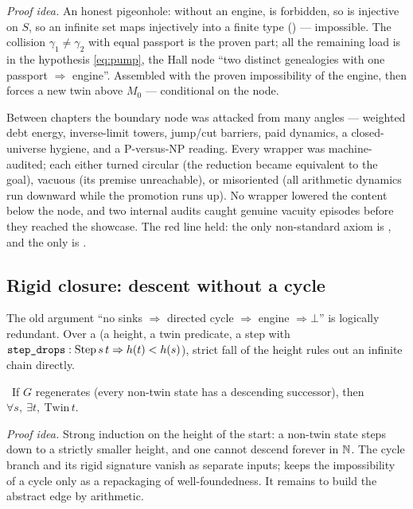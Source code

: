 \emph{Proof idea.} An honest pigeonhole: without an engine,  is forbidden, so  is
injective on $S$, so an infinite set maps injectively into a finite type
() --- impossible. The collision $\gamma_1\ne\gamma_2$ with equal
passport is the \green{} proven part; all the remaining load is in the \red{} hypothesis
\cref{eq:pump}, the Hall node ``two distinct genealogies with one passport $\Rightarrow$ engine''.
Assembled with the proven impossibility of the engine,  then
forces a new twin above $M_0$ --- conditional on the node.

\begin{remark}
Between chapters the boundary node was attacked from many angles --- weighted debt energy, inverse-limit
towers, jump/cut barriers, paid dynamics, a closed-universe hygiene, and a $\mathrm{P}$-versus-$\mathrm{NP}$
reading. Every wrapper was machine-audited; each either turned circular (the reduction became
equivalent to the goal), vacuous (its premise unreachable), or misoriented (all arithmetic dynamics run
downward while the promotion runs up). No wrapper lowered the content below the node, and two internal
audits caught genuine vacuity episodes before they reached the showcase. The red line held: the only
non-standard axiom is \axiom{}, and the only  is .
\end{remark}

\subsection{Rigid closure: descent without a cycle}

The old argument ``no sinks $\Rightarrow$ directed cycle $\Rightarrow$ engine $\Rightarrow\bot$'' is
logically redundant. Over a  (a height, a twin predicate, a step with
$\texttt{step\_drops}:\mathrm{Step}\,s\,t\Rightarrow h(t)<h(s)$), strict fall of the height rules out an
infinite chain directly.

\begin{theorem}\label{thm:reaches_twin}
\green{}\ If $G$ regenerates (every non-twin state has a descending successor), then
$\forall s,\ \exists t,\ \mathrm{Twin}\,t$. 
\end{theorem}

\emph{Proof idea.} Strong induction on the height of the start: a non-twin state steps down to a
strictly smaller height, and one cannot descend forever in $\mathbb{N}$. The cycle branch and its
rigid signature vanish as separate inputs;  keeps the impossibility of a cycle only as
a repackaging of well-foundedness. It remains to build the abstract edge by arithmetic.

